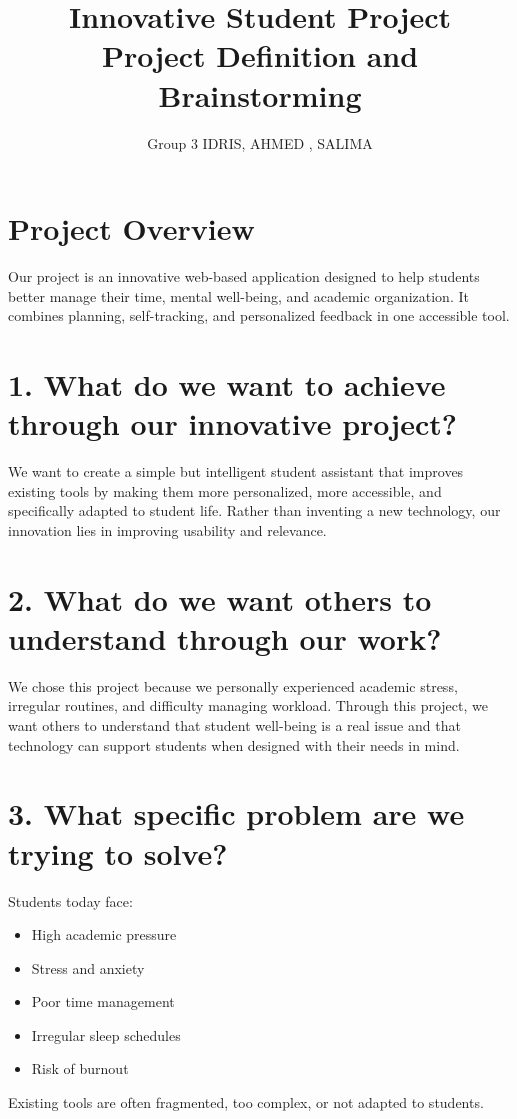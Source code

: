 \documentclass[11pt,a4paper]{article}
\title{\textbf{Innovative Student Project}\\Project Definition and Brainstorming}
\author{Group 3  IDRIS, AHMED , SALIMA }
\date{}
\begin{document}
\maketitle

\section*{Project Overview}
Our project is an innovative web-based application designed to help students better manage their time, mental well-being, and academic organization. It combines planning, self-tracking, and personalized feedback in one accessible tool.

\section*{1. What do we want to achieve through our innovative project?}
We want to create a simple but intelligent student assistant that improves existing tools by making them more personalized, more accessible, and specifically adapted to student life.  
Rather than inventing a new technology, our innovation lies in improving usability and relevance.

\section*{2. What do we want others to understand through our work?}
We chose this project because we personally experienced academic stress, irregular routines, and difficulty managing workload.  
Through this project, we want others to understand that student well-being is a real issue and that technology can support students when designed with their needs in mind.

\section*{3. What specific problem are we trying to solve?}
Students today face:
\begin{itemize}
  \item High academic pressure
  \item Stress and anxiety
  \item Poor time management
  \item Irregular sleep schedules
  \item Risk of burnout
\end{itemize}
Existing tools are often fragmented, too complex, or not adapted to students.
\end{document}
